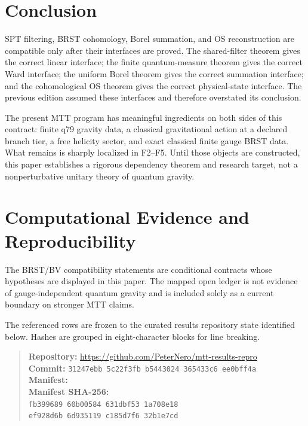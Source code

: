 \documentclass[11pt]{article}
\begin{document}
\section{Conclusion}

SPT filtering, BRST cohomology, Borel summation, and OS reconstruction are
compatible only after their interfaces are proved.  The shared-filter theorem
gives the correct linear interface; the finite quantum-measure theorem gives
the correct Ward interface; the uniform Borel theorem gives the correct
summation interface; and the cohomological OS theorem gives the correct
physical-state interface.  The previous edition assumed these interfaces and
therefore overstated its conclusion.

The present MTT program has meaningful ingredients on both sides of this
contract: finite q79 gravity data, a classical gravitational action at a
declared branch tier, a free helicity sector, and exact classical finite gauge
BRST data.  What remains is sharply localized in F2--F5.  Until those objects
are constructed, this paper establishes a rigorous dependency theorem and
research target, not a nonperturbative unitary theory of quantum gravity.

\small

\section*{Computational Evidence and Reproducibility}
The BRST/BV compatibility statements are conditional contracts whose hypotheses are displayed in this paper. The mapped open ledger is not evidence of gauge-independent quantum gravity and is included solely as a current boundary on stronger MTT claims.

The referenced rows are frozen to the curated results repository state identified below. Hashes are grouped in eight-character blocks for line breaking.
\begin{quote}\small
\textbf{Repository:} \url{https://github.com/PeterNero/mtt-results-repro}\\
\textbf{Commit:} \texttt{31247ebb 5c22f3fb b5443024 365433c6 ee0bff4a}\\
\textbf{Manifest:} \\
\textbf{Manifest SHA-256:}\\
\texttt{fb399689 60b00584 631dbf53 1a708e18}\\
\texttt{ef928d6b 6d935119 c185d7f6 32b1e7cd}
\end{quote}
\end{document}
